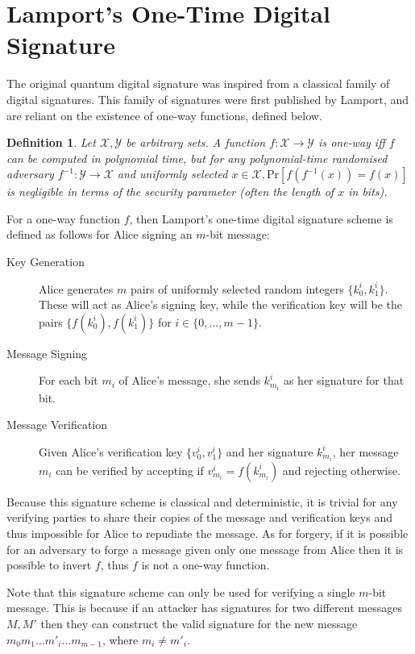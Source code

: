 \documentclass[%
 reprint,
 amsmath,amssymb,
 aps,
 pra,
]{revtex4-1}
\newtheorem{definition}{Definition}[section]
\begin{document}
\section{Lamport's One-Time Digital Signature}
\label{sec:lamport}

The original quantum digital signature was inspired from a classical family of digital signatures. This family of signatures were first published by Lamport\cite{lamp79}, and are reliant on the existence of one-way functions, defined below.

\begin{definition}
Let $\mathcal{X}, \mathcal{Y}$ be arbitrary sets. A function $f:\mathcal{X} \rightarrow \mathcal{Y}$ is one-way iff $f$ can be computed in polynomial time, but for any polynomial-time randomised adversary $f^{-1}:\mathcal{Y} \rightarrow \mathcal{X}$ and uniformly selected $x \in \mathcal{X}, \mathrm{Pr}[f(f^{-1}(x)) = f(x)]$ is negligible in terms of the security parameter (often the length of $x$ in bits).
\end{definition}

For a one-way function $f$, then Lamport's one-time digital signature scheme is defined as follows for Alice signing an $m$-bit message:

\begin{description}
\item[Key Generation]Alice generates $m$ pairs of uniformly selected random integers $\{k^i_0, k^i_1\}$. These will act as Alice's signing key, while the verification key will be the pairs $\{f(k^i_0), f(k^i_1)\}$ for $i \in \{0,...,m-1\}$.
\item[Message Signing]For each bit $m_i$ of Alice's message, she sends $k^i_{m_i}$ as her signature for that bit.
\item[Message Verification]Given Alice's verification key $\{v^i_0, v^i_1\}$ and her signature $k^i_{m_i}$, her message $m_i$ can be verified by accepting if $v^i_{m_i} = f(k^i_{m_i})$ and rejecting otherwise.
\end{description}

Because this signature scheme is classical and deterministic, it is trivial for any verifying parties to share their copies of the message and verification keys and thus impossible for Alice to repudiate the message. As for forgery, if it is possible for an adversary to forge a message given only one message from Alice then it is possible to invert $f$, thus $f$ is not a one-way function.

Note that this signature scheme can only be used for verifying a single $m$-bit message. This is because if an attacker has signatures for two different messages $M, M'$ then they can construct the valid signature for the new message $m_0m_1...m'_i...m_{m-1}$, where $m_i \neq m'_i$.
\end{document}
